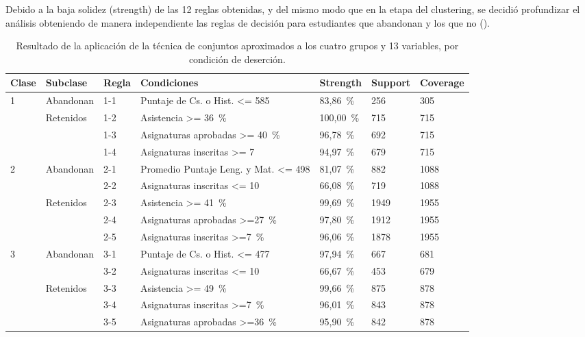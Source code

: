 \documentclass[portuguese]{textolivre}
\begin{document}
Debido a la baja solidez (strength) de las 12 reglas obtenidas, y del mismo modo que en la etapa del clustering, se decidió profundizar el análisis obteniendo de manera independiente las reglas de decisión para estudiantes que abandonan y los que no ().

\begin{table}[htbp]
    \caption{Resultado de la aplicación de la técnica de conjuntos aproximados a los cuatro grupos y 13 variables, por condición de deserción.}
    \label{Tabla 9}
    \centering
    \begin{tabular}{lllp{5cm}lll}
    \toprule
    Clase & Subclase & Regla & Condiciones & Strength & Support & Coverage\\
    \midrule
    \multirow{4}{*}{1} & Abandonan & 1-1 & Puntaje de Cs. o Hist. <= 585 & 83,86~\% & 256 & 305\\
    \cmidrule{2-7}
    & \multirow{3}{*}{Retenidos} & 1-2 & Asistencia >= 36~\% & 100,00~\% & 715 & 715\\
    & & 1-3 & Asignaturas aprobadas >= 40~\% & 96,78~\% & 692 & 715\\
    & & 1-4 & Asignaturas inscritas >= 7 & 94,97~\% & 679 & 715\\
    \cmidrule{1-7}
    \multirow{5}{*}{2} &
    \multirow{2}{*}{Abandonan} & 2-1 & Promedio Puntaje Leng. y Mat. <= 498 & 81,07~\% & 882 & 1088\\
    & & 2-2 & Asignaturas inscritas <= 10 & 66,08~\% & 719 & 1088\\
    \cmidrule{2-7}
    & \multirow{3}{*}{Retenidos} & 2-3 & Asistencia >= 41~\% & 99,69~\% & 1949 & 1955\\
    & & 2-4 & Asignaturas aprobadas >=27~\% & 97,80~\% & 1912 & 1955\\
    & & 2-5 & Asignaturas inscritas >=7~\% & 96,06~\% & 1878 & 1955\\
    \cmidrule{1-7}
    \multirow{5}{*}{3} &
    \multirow{2}{*}{Abandonan} & 3-1 & Puntaje de Cs. o Hist. <= 477 & 97,94~\% & 667 & 681\\
    & & 3-2 & Asignaturas inscritas <= 10 & 66,67~\% & 453 & 679\\
    \cmidrule{2-7}
    & \multirow{3}{*}{Retenidos} & 3-3 & Asistencia >= 49~\% & 99,66~\% & 875 & 878\\
    & & 3-4 & Asignaturas inscritas >=7~\% & 96,01~\% & 843 & 878\\
    & & 3-5 & Asignaturas aprobadas >=36~\% & 95,90~\% & 842 & 878\\

\end{tabular}
\end{table}
\end{document}
